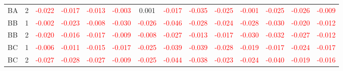 \begin{table}[!htb]
{\begin{tabular}{llcccccccccccc}
BA & 2 & \textcolor{red}{-0.022} & \textcolor{red}{-0.017} & \textcolor{red}{-0.013} & \textcolor{red}{-0.003} & 0.001 & \textcolor{red}{-0.017} & \textcolor{red}{-0.035} & \textcolor{red}{-0.025} & \textcolor{red}{-0.001} & \textcolor{red}{-0.025} & \textcolor{red}{-0.026} & \textcolor{red}{-0.009}\\
BB & 1 & \textcolor{red}{-0.002} & \textcolor{red}{-0.023} & \textcolor{red}{-0.008} & \textcolor{red}{-0.030} & \textcolor{red}{-0.026} & \textcolor{red}{-0.046} & \textcolor{red}{-0.028} & \textcolor{red}{-0.024} & \textcolor{red}{-0.028} & \textcolor{red}{-0.030} & \textcolor{red}{-0.020} & \textcolor{red}{-0.012}\\
BB & 2 & \textcolor{red}{-0.020} & \textcolor{red}{-0.016} & \textcolor{red}{-0.017} & \textcolor{red}{-0.009} & \textcolor{red}{-0.008} & \textcolor{red}{-0.027} & \textcolor{red}{-0.013} & \textcolor{red}{-0.017} & \textcolor{red}{-0.030} & \textcolor{red}{-0.032} & \textcolor{red}{-0.027} & \textcolor{red}{-0.012}\\
BC & 1 & \textcolor{red}{-0.006} & \textcolor{red}{-0.011} & \textcolor{red}{-0.015} & \textcolor{red}{-0.017} & \textcolor{red}{-0.025} & \textcolor{red}{-0.039} & \textcolor{red}{-0.039} & \textcolor{red}{-0.028} & \textcolor{red}{-0.019} & \textcolor{red}{-0.017} & \textcolor{red}{-0.024} & \textcolor{red}{-0.017}\\
BC & 2 & \textcolor{red}{-0.027} & \textcolor{red}{-0.028} & \textcolor{red}{-0.027} & \textcolor{red}{-0.009} & \textcolor{red}{-0.025} & \textcolor{red}{-0.044} & \textcolor{red}{-0.038} & \textcolor{red}{-0.023} & \textcolor{red}{-0.024} & \textcolor{red}{-0.040} & \textcolor{red}{-0.019} & \textcolor{red}{-0.016}\\
\hline
    \end{tabular}%
    }
\end{table}
